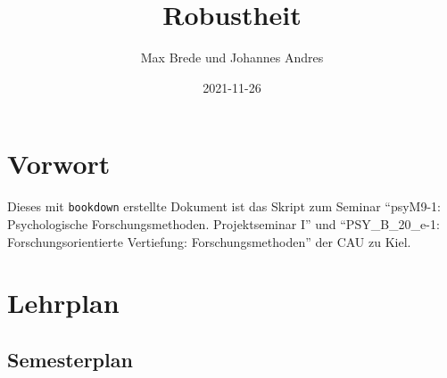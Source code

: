 \documentclass[
]{book}
\title{Robustheit}
\author{Max Brede und Johannes Andres}
\date{2021-11-26}
\begin{document}
\maketitle

{
\setcounter{tocdepth}{1}
\tableofcontents
}
\hypertarget{vorwort}{%
\chapter{Vorwort}\label{vorwort}}

Dieses mit \texttt{bookdown} erstellte Dokument ist das Skript zum Seminar ``psyM9-1: Psychologische Forschungsmethoden. Projektseminar I'' und ``PSY\_B\_20\_e-1: Forschungsorientierte Vertiefung: Forschungsmethoden'' der CAU zu Kiel.

\hypertarget{lehrplan}{%
\chapter{Lehrplan}\label{lehrplan}}

\hypertarget{semesterplan}{%
\section{Semesterplan}\label{semesterplan}}

\scriptsize
\end{document}
